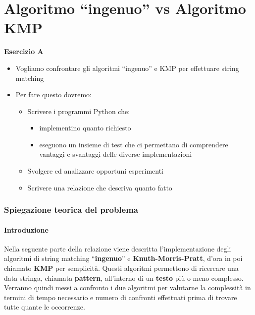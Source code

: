 \documentclass{article}
\begin{document}
\newpage

\part{Algoritmo ``ingenuo'' vs Algoritmo KMP}

\begin{tcolorbox}[colback=lightgray!20,
        colframe=black,
        arc=3mm, auto outer arc,]

    \textbf{Esercizio A}
    \begin{itemize}
        \item Vogliamo confrontare gli algoritmi ``ingenuo'' e KMP per effettuare string matching
        \item Per fare questo dovremo:
              \begin{itemize}
                  \item Scrivere i programmi Python che:
                        \begin{itemize}
                            \item implementino quanto richiesto
                            \item eseguono un insieme di test che ci permettano di comprendere vantaggi e svantaggi delle diverse implementazioni
                        \end{itemize}
                  \item Svolgere ed analizzare opportuni esperimenti
                  \item Scrivere una relazione che descriva quanto fatto
              \end{itemize}
    \end{itemize}
\end{tcolorbox}

\section{Spiegazione teorica del problema }

\subsection{Introduzione}
Nella seguente parte della relazione viene descritta l'implementazione degli algoritmi di string matching ``\textbf{ingenuo}'' e \textbf{Knuth-Morris-Pratt}, d'ora in poi chiamato \textbf{KMP} per semplicità. Questi algoritmi permettono di ricercare una data stringa, chiamata \textbf{pattern}, all'interno di un \textbf{testo} più o meno complesso. Verranno quindi messi a confronto i due algoritmi per valutarne la complessità in termini di tempo necessario e numero di confronti effettuati prima di trovare tutte quante le occorrenze.
\end{document}
